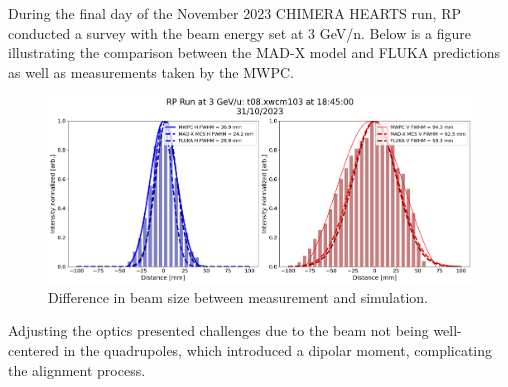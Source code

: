 \documentclass[a4paper,
               biblatex,     %
               ]{jacow}
\begin{document}



During the final day of the November 2023 CHIMERA HEARTS run, RP conducted a survey with the beam energy set at 3 GeV/n. Below is a figure illustrating the comparison between the MAD-X model and FLUKA predictions as well as measurements taken by the MWPC.

\begin{figure}[!htb]
\centering
\includegraphics*[width=1.0\columnwidth]{rp_survey.png}
\caption{Difference in beam size between measurement and simulation.}
\label{fig:diff_beam_size}
\end{figure}

Adjusting the optics presented challenges due to the beam not being well-centered in the quadrupoles, which introduced a dipolar moment, complicating the alignment process.

\end{document}
